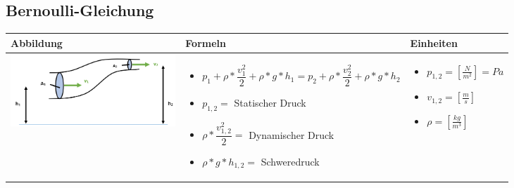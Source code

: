 \subsection{Bernoulli-Gleichung}				%
\begin{table}[h!]
	\begin{tabular}{ | m{6cm} | m{8cm} | m{4cm} | }
		\hline
		Abbildung & Formeln & Einheiten \\ \hline
		\midrule
		\begin{minipage}{.3\textwidth}
			\includegraphics[width=6.2cm]{Figures/bernoulli}
		\end{minipage}
		&
		\begin{itemize}
			\item$p_{1}+\rho*\dfrac{v_{1}^2}{2}+\rho*g*h_{1}=p_{2}+\rho*\dfrac{v_{2}^2}{2}+\rho*g*h_{2}$	\item$p_{1,2}=$ Statischer Druck
			\item$\rho*\dfrac{v_{1,2}^2}{2}=$ Dynamischer Druck
			\item$\rho*g*h_{1,2}=$ Schweredruck	
		\end{itemize}
		& 
		\begin{itemize}
			\item $p_{1,2}=[\frac{N}{m^2}]=Pa$
			\item $v_{1,2}=[\frac{m}{s}]$	
			\item $\rho=[\frac{kg}{m^3}]$	
		\end{itemize}
		\\ \hline
	\end{tabular}
\end{table}

